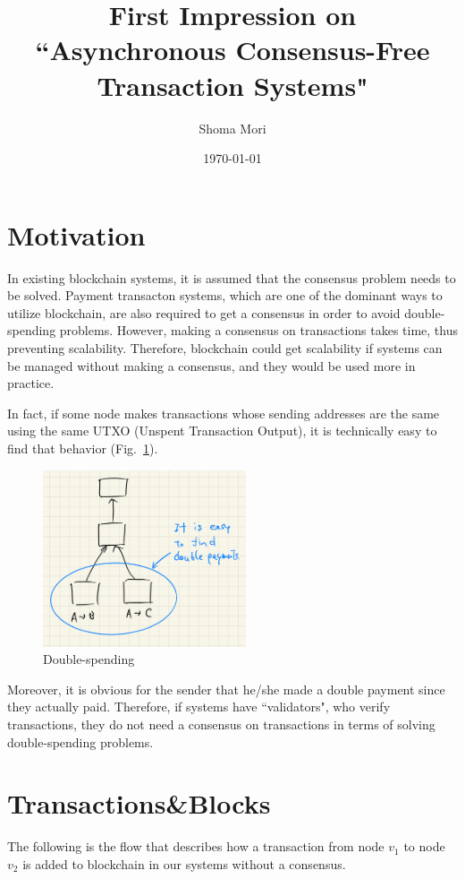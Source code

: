 \documentclass[a4j,11pt,uplatex,twocolumn]{article}
\title{First Impression on \\``Asynchronous Consensus-Free Transaction Systems"}
\author{Shoma Mori}
\date{\today}
\begin{document}
\maketitle

\section{Motivation}
In existing blockchain systems, it is assumed that the consensus problem needs to be solved.
Payment transacton systems, which are one of the dominant ways to utilize blockchain, are also required to get a consensus in order to avoid double-spending problems.
However, making a consensus on transactions takes time, thus preventing scalability.
Therefore, blockchain could get scalability if systems can be managed without making a consensus, and they would be used more in practice.

In fact, if some node makes transactions whose sending addresses are the same using the same UTXO (Unspent Transaction Output), it is technically easy to find that behavior (Fig.~\ref{fig:double-spending}).
\begin{figure}[tbp]
    \begin{center}
        \includegraphics[width=6.0cm]{./fig/double_payments.jpeg}
        \caption{Double-spending}
        \label{fig:double-spending}
    \end{center}
\end{figure}
Moreover, it is obvious for the sender that he/she made a double payment since they actually paid.
Therefore, if systems have ``validators", who verify transactions, they do not need a consensus on transactions in terms of solving double-spending problems.

\section{Transactions\&Blocks}
The following is the flow that describes how a transaction from node $v_1$ to node $v_2$ is added to blockchain in our systems without a consensus.
\end{document}
